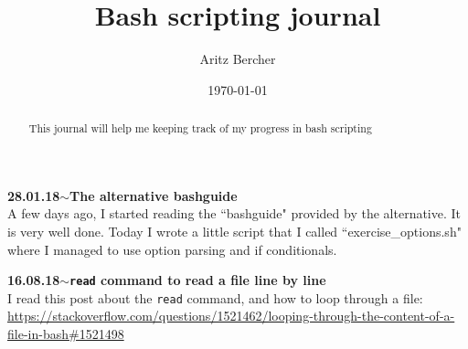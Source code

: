 \documentclass[11pt,a4paper]{article}
\title{Bash scripting journal}
\author{Aritz Bercher}
\date{\today}
\newenvironment{loggentry}[2]%
{\noindent\textbf{#1}\hspace{1cm}$\mathbf{\sim}$\text{ }\textbf{#2}\\}{\vspace{0.5cm}}
\begin{document}
\maketitle

\begin{abstract}
This journal will help me keeping track of my progress in bash scripting
\end{abstract}

\begin{loggentry}{28.01.18}{The alternative bashguide}
A few days ago, I started reading the ``bashguide" provided by the alternative. It is very well done. Today I wrote a little script that I called ``exercise\_options.sh" where I managed to use option parsing and if conditionals.
\end{loggentry}

\begin{loggentry}{16.08.18}{\texttt{read} command to read a file line by line}
I read this post about the \texttt{read} command, and how to loop through a file:\\
\url{https://stackoverflow.com/questions/1521462/looping-through-the-content-of-a-file-in-bash#1521498}\\

\end{loggentry}
\end{document}
